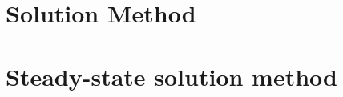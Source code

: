 \documentclass[letterpaper,12pt]{article}
\theoremstyle{definition}
\begin{document}


\section{Solution Method}\label{SecLgOpenSol}


  \section{Steady-state solution method}\label{SecLgOpenSolSS}
\end{document}
